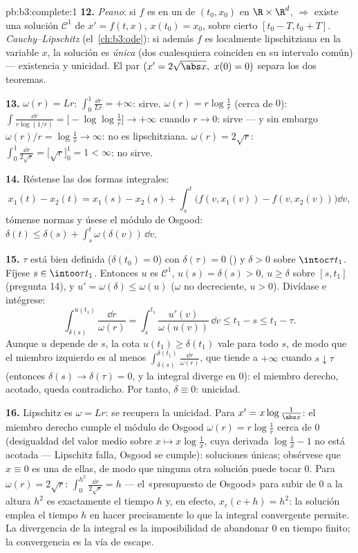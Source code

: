 \begin{solution}{pb:b3:complete:1}
\textbf{12.} \emph{Peano}: si $f$ es
 en un
 de $(t_0, x_0)$ en
$\R\times\R^d$, $\Rightarrow$ existe una solución $\mathcal C^1$ de
$x' = f(t,x)$, $x(t_0) = x_0$, sobre cierto $[t_0 - T, t_0 + T]$.
\emph{Cauchy--Lipschitz} (el~\cref{ch:b3:ode}): si además $f$ es
localmente lipschitziana en la variable $x$, la solución es \emph{única}
(dos cualesquiera coinciden en su intervalo común) --- existencia y
unicidad. El par $(x' = 2\sqrt{\abs x},\ x(0) = 0)$ separa los dos
teoremas.

\textbf{13.} $\omega(r) = Lr$: $\int_0^1\frac{\dd r}{Lr} =
+\infty$: sirve. $\omega(r) = r\log\frac1r$ (cerca de $0$):
$\int\frac{\dd r}{r\log(1/r)} = \bigl[-\log\log\frac1r\bigr]
\to +\infty$ cuando $r \to 0$: sirve --- y sin embargo $\omega(r)/r =
\log\frac1r \to \infty$: no es lipschitziana. $\omega(r) = 2\sqrt
r$: $\int_0^1\frac{\dd r}{2\sqrt r} = \bigl[\sqrt r\bigr]_0^1
= 1 < \infty$: no sirve.

\textbf{14.} Réstense las dos formas integrales:
\[
x_1(t) - x_2(t) = x_1(s) - x_2(s) + \int_s^t\bigl(f(v,
x_1(v)) - f(v, x_2(v))\bigr)\dd v,
\]
tómense normas y úsese el módulo de Osgood: $\delta(t) \leq
\delta(s) + \int_s^t\omega(\delta(v))\,\dd v$.

\textbf{15.} $\tau$ está bien definida ($\delta(t_0) = 0$) con
$\delta(\tau) = 0$ () y
$\delta > 0$ sobre $\intoc\tau{t_1}$. Fíjese $s \in \intoo\tau{t_1}$.
Entonces $u$ es $\mathcal C^1$, $u(s) = \delta(s) > 0$, $u \geq \delta$
sobre $[s, t_1]$ (pregunta 14), y $u' = \omega(\delta) \leq
\omega(u)$ ($\omega$ no decreciente, $u > 0$). Divídase e intégrese:
\[
\int_{\delta(s)}^{u(t_1)}\frac{\dd r}{\omega(r)}
= \int_s^{t_1}\frac{u'(v)}{\omega(u(v))}\,\dd v \leq t_1 - s
\leq t_1 - \tau .
\]
Aunque $u$ depende de $s$, la cota $u(t_1) \geq
\delta(t_1)$ vale para todo $s$, de modo que el miembro izquierdo es al
menos $\int_{\delta(s)}^{\delta(t_1)}\frac{\dd r}{\omega(r)}$, que
tiende a $+\infty$ cuando $s \downarrow \tau$ (entonces
$\delta(s) \to \delta(\tau) = 0$, y la integral diverge en $0$): el
miembro derecho, acotado, queda contradicho. Por tanto,
$\delta \equiv 0$: unicidad.

\textbf{16.} Lipschitz es $\omega = Lr$: se recupera la unicidad. Para
$x' = x\log\frac1{\abs x}$: el miembro derecho cumple el módulo de
Osgood $\omega(r) = r\log\frac1r$ cerca de $0$ (desigualdad del valor
medio sobre $x \mapsto x\log\frac1x$, cuya derivada $\log\frac1x - 1$ no
está acotada --- Lipschitz falla, Osgood se cumple): soluciones únicas;
obsérvese que $x \equiv 0$ es una de ellas, de modo que ninguna otra
solución puede tocar $0$. Para $\omega(r) = 2\sqrt r$:
$\int_0^{h^2}\frac{\dd r}{2\sqrt r} = h$ --- el «presupuesto de Osgood»
para subir de $0$ a la altura $h^2$ es exactamente el tiempo $h$ y, en
efecto, $x_c(c + h) = h^2$: la solución emplea el tiempo $h$ en hacer
precisamente lo que la integral convergente permite. La divergencia de
la integral es la imposibilidad de abandonar $0$ en tiempo finito; la
convergencia es la vía de escape.


\end{solution}
